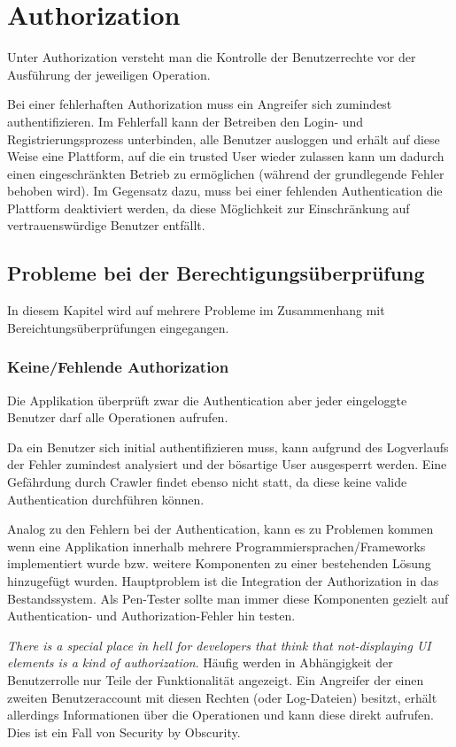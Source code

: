 \chapter{Authorization}

Unter Authorization versteht man die Kontrolle der Benutzerrechte vor der Ausführung der jeweiligen Operation.

Bei einer fehlerhaften Authorization muss ein Angreifer sich zumindest authentifizieren. Im Fehlerfall kann der Betreiben den Login- und Registrierungsprozess unterbinden, alle Benutzer ausloggen und erhält auf diese Weise eine Plattform, auf die ein trusted User wieder zulassen kann um dadurch einen eingeschränkten Betrieb zu ermöglichen (während der grundlegende Fehler behoben wird). Im Gegensatz dazu, muss bei einer fehlenden Authentication die Plattform deaktiviert werden, da diese Möglichkeit zur Einschränkung auf vertrauenswürdige Benutzer entfällt.

\section{Probleme bei der Berechtigungsüberprüfung}

In diesem Kapitel wird auf mehrere Probleme im Zusammenhang mit Bereichtungsüberprüfungen eingegangen.

\subsection{Keine/Fehlende Authorization}

Die Applikation überprüft zwar die Authentication aber jeder eingeloggte Benutzer darf alle Operationen aufrufen.

Da ein Benutzer sich initial authentifizieren muss, kann aufgrund des Logverlaufs der Fehler zumindest analysiert und der bösartige User ausgesperrt werden. Eine Gefährdung durch Crawler findet ebenso nicht statt, da diese keine valide Authentication durchführen können.

Analog zu den Fehlern bei der Authentication, kann es zu Problemen kommen wenn eine Applikation innerhalb mehrere Programmiersprachen/Frameworks implementiert wurde bzw. weitere Komponenten zu einer bestehenden Lösung hinzugefügt wurden. Hauptproblem ist die Integration der Authorization in das Bestandssystem. Als Pen-Tester sollte man immer diese Komponenten gezielt auf Authentication- und Authorization-Fehler hin testen.

\textit{There is a special place in hell for developers that think that not-displaying UI elements is a kind of authorization}. Häufig werden in Abhängigkeit der Benutzerrolle nur Teile der Funktionalität angezeigt. Ein Angreifer der einen zweiten Benutzeraccount mit diesen Rechten (oder Log-Dateien) besitzt, erhält allerdings Informationen über die Operationen und kann diese direkt aufrufen. Dies ist ein Fall von Security by Obscurity.

